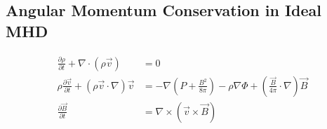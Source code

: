 \subsection{Angular Momentum Conservation in Ideal MHD}

\begin{align}
  \frac{\partial\rho}{\partial t}+\nabla\cdot\left(\rho\vec v\right) &= 0\label{eq:densCons}\\
  \rho\frac{\partial\vec v}{\partial t}+\left(\rho\vec v\cdot\nabla\right) \vec v &=-\nabla\left(P+\frac{B^2}{8\pi}\right)-\rho\nabla\Phi+\left(\frac{\vec B}{4\pi}\cdot\nabla\right)\vec B\label{eq:momCons}\\
  \frac{\partial \vec B}{\partial t}&=\nabla\times\left(\vec v\times\vec B\right)
\end{align}

